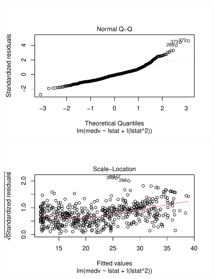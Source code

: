 \documentclass[
  letterpaper,
  DIV=11,
  numbers=noendperiod]{scrartcl}
\begin{document}
\begin{figure}[H]

{\centering \includegraphics{Resumen-2---3_files/figure-pdf/unnamed-chunk-21-2.pdf}

}

\end{figure}

\begin{figure}[H]

{\centering \includegraphics{Resumen-2---3_files/figure-pdf/unnamed-chunk-21-3.pdf}

}

\end{figure}
\end{document}
